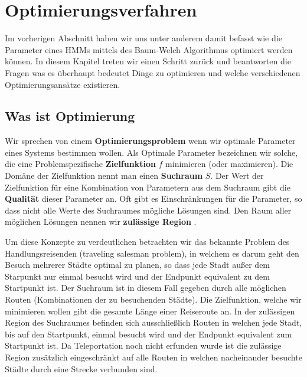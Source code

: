 \section{Optimierungsverfahren}


Im vorherigen Abschnitt haben wir uns unter anderem damit befasst wie die Parameter eines HMMs mittels des Baum-Welch Algorithmus optimiert werden können. In diesem Kapitel treten wir einen Schritt zurück und beantworten die Fragen was es überhaupt bedeutet Dinge zu optimieren und welche verschiedenen Optimierungsansätze existieren.

\subsection*{Was ist Optimierung}
Wir sprechen von einem \textbf{Optimierungsproblem} wenn wir optimale Parameter eines Systems bestimmen wollen. Als Optimale Parameter bezeichnen wir solche, die eine Problemspezifische \textbf{Zielfunktion} $f$ minimieren (oder maximieren). Die Domäne der Zielfunktion nennt man einen \textbf{Suchraum} $S$. Der Wert der Zielfunktion für eine Kombination von Parametern aus dem Suchraum gibt die \textbf{Qualität} dieser Parameter an. Oft gibt es Einschränkungen für die Parameter, so dass nicht alle Werte des Suchraumes mögliche Lösungen sind. Den Raum aller möglichen Lösungen nennen wir \textbf{zulässige Region} \cite*{MetaheuristicsEGT}.

Um diese Konzepte zu verdeutlichen betrachten wir das bekannte Problem des Handlungsreisenden (traveling salesman problem), in welchem es darum geht den Besuch mehrerer Städte optimal zu planen, so dass jede Stadt außer dem Starpunkt nur einmal besucht wird und der Endpunkt equivalent zu dem Startpunkt ist. Der Suchraum ist in diesem Fall gegeben durch alle möglichen Routen (Kombinationen der zu besuchenden Städte). Die Zielfunktion, welche wir minimieren wollen gibt die gesamte Länge einer Reiseroute an. In der zulässigen Region des Suchraumes befinden sich ausschließlich Routen in welchen jede Stadt, bis auf den Startpunkt, einmal besucht wird und der Endpunkt equivalent zum Startpunkt ist. Da Teleportation noch nicht erfunden wurde ist die zulässige Region zusätzlich eingeschränkt auf alle Routen in welchen nacheinander besuchte Städte durch eine Strecke verbunden sind.

